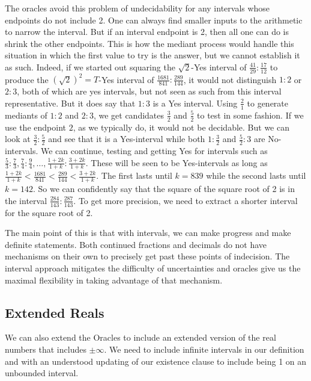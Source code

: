 \documentclass[12pt]{article}
\begin{document}
The oracles avoid this problem of undecidability for any intervals whose endpoints do not include 2. One can always find smaller inputs to the arithmetic to narrow the interval. But if an interval endpoint is 2, then all one can do is shrink the other endpoints. This is how the mediant process would handle this situation in which the first value to try is the answer, but we cannot establish it as such. Indeed, if we started out squaring the $\sqrt{2}$-Yes interval of $\frac{41}{29}:\frac{17}{12}$ to produce the $(\sqrt{2})^2=T$-Yes interval of $\frac{1681}{841}:\frac{289}{144}$, it would not distinguish $1:2$ or $2:3$, both of which are yes intervals, but not seen as such from this interval representative. But it does say that $1:3$ is a Yes interval. Using $\frac{2}{1}$ to generate mediants of $1:2$ and $2:3$, we get candidates $\frac{3}{2}$ and $\frac{5}{2}$ to test in some fashion. If we use the endpoint $2$, as we typically do, it would not be decidable. But we can look at $\frac{3}{2}:\frac{5}{2}$ and see that it is a Yes-interval while both $1:\frac{3}{2}$ and $\frac{5}{2}:3$ are No-intervals. We can continue, testing and getting Yes for intervals such as $\frac{5}{3}:\frac{7}{3}, \frac{7}{4}:\frac{9}{4}, \ldots, \frac{1 + 2k}{1+k}:\frac{3+2k}{1+k}$. These will be seen to be Yes-intervals as long as $\frac{1+2k}{1+k} < \frac{1681}{841} < \frac{289}{144} < \frac{3+2k}{1+k}$. The first lasts until $k=839$ while the second lasts until $k=142$. So we can confidently say that the square of the square root of 2 is in the interval $\frac{284}{143}:\frac{287}{143}$. To get more precision, we need to extract a shorter interval for the square root of 2. 

The main point of this is that with intervals, we can make progress and make definite statements. Both continued fractions and decimals do not have mechanisms on their own to precisely get past these points of indecision. The interval approach mitigates the difficulty of uncertainties and oracles give us the maximal flexibility in taking advantage of that mechanism.


\subsection{Extended Reals}

We can also extend the Oracles to include an extended version of the real numbers that includes $\pm \infty$. We need to include infinite intervals in our definition and with an understood updating of our existence clause to include being 1 on an unbounded interval.
\end{document}
